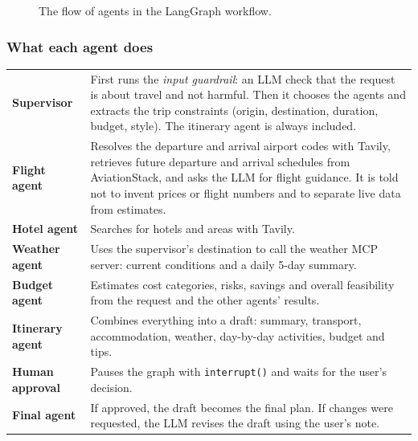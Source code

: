 \documentclass[11pt,a4paper]{article}
\newcommand{\code}[1]{\texttt{\color{slate}#1}}
\begin{document}
\begin{figure}[htbp]
\caption{The flow of agents in the LangGraph workflow.}\label{fig:flow}
\end{figure}

\subsubsection{What each agent does}
\begin{tabularx}{\linewidth}{@{}>{\leavevmode\color{slate}\bfseries}p{30mm}L@{}}
\toprule
Supervisor & First runs the \emph{input guardrail}: an LLM check that the request is about travel and not harmful. Then it chooses the agents and extracts the trip constraints (origin, destination, duration, budget, style). The itinerary agent is always included. \\
Flight agent & Resolves the departure and arrival airport codes with Tavily, retrieves future departure and arrival schedules from AviationStack, and asks the LLM for flight guidance. It is told not to invent prices or flight numbers and to separate live data from estimates. \\
Hotel agent & Searches for hotels and areas with Tavily. \\
Weather agent & Uses the supervisor's destination to call the weather MCP server: current conditions and a daily 5-day summary. \\
Budget agent & Estimates cost categories, risks, savings and overall feasibility from the request and the other agents' results. \\
Itinerary agent & Combines everything into a draft: summary, transport, accommodation, weather, day-by-day activities, budget and tips. \\
Human approval & Pauses the graph with \code{interrupt()} and waits for the user's decision. \\
Final agent & If approved, the draft becomes the final plan. If changes were requested, the LLM revises the draft using the user's note. \\
\bottomrule
\end{tabularx}
\end{document}
